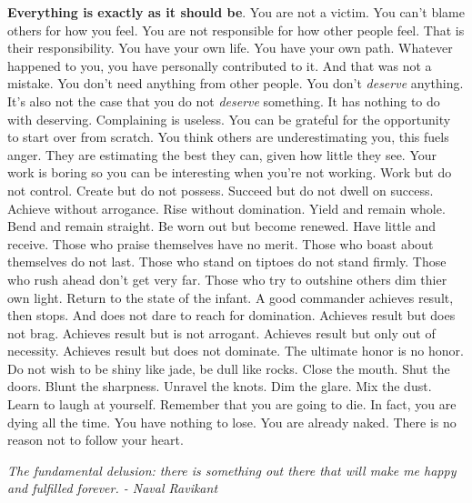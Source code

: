 \documentclass[a4paper,hidelinks]{article}
\begin{document}
\textbf{Everything is exactly as it should be}.
You are not a victim.
You can't blame others for how you feel.
You are not responsible for how other people feel.
That is their responsibility.
You have your own life.
You have your own path.
Whatever happened to you, you have personally contributed to it.
And that was not a mistake.
You don't need anything from other people.
You don't \textit{deserve} anything.
It's also not the case that you do not \textit{deserve} something.
It has nothing to do with deserving.
Complaining is useless.
You can be grateful for the opportunity to start over from scratch.
You think others are underestimating you, this fuels anger.
They are estimating the best they can, given how little they see.
Your work is boring so you can be interesting when you're not working.
Work but do not control.
Create but do not possess.
Succeed but do not dwell on success.
Achieve without arrogance.
Rise without domination.
Yield and remain whole.
Bend and remain straight.
Be worn out but become renewed.
Have little and receive.
Those who praise themselves have no merit.
Those who boast about themselves do not last.
Those who stand on tiptoes do not stand firmly.
Those who rush ahead don't get very far.
Those who try to outshine others dim thier own light.
Return to the state of the infant.
A good commander achieves result, then stops.
And does not dare to reach for domination.
Achieves result but does not brag.
Achieves result but is not arrogant.
Achieves result but only out of necessity.
Achieves result but does not dominate.
The ultimate honor is no honor.
Do not wish to be shiny like jade, be dull like rocks.
Close the mouth.
Shut the doors.
Blunt the sharpness.
Unravel the knots.
Dim the glare.
Mix the dust.
Learn to laugh at yourself.
Remember that you are going to die.
In fact, you are dying all the time.
You have nothing to lose.
You are already naked.
There is no reason not to follow your heart.

\newpage

\begin{center}
\textit{
The fundamental delusion: there is something out there that will make me happy and fulfilled forever. - Naval Ravikant
}
\end{center}
\end{document}
